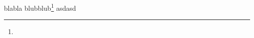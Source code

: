 \documentclass{beamer}
\begin{document}
	\begin{frame}
		blabla \pause
		blubblub\footnote<2->{} \pause
		asdasd
	\end{frame}
	
	
\end{document}
